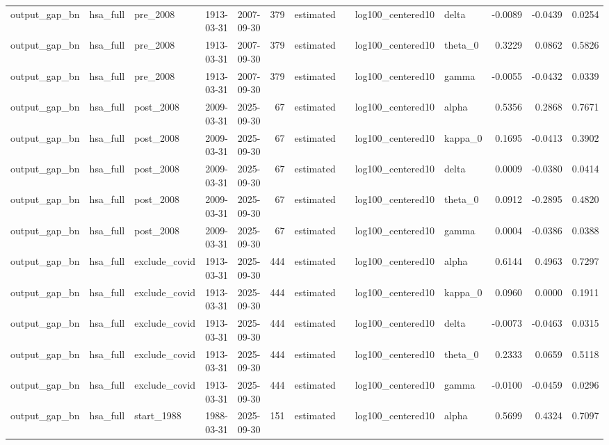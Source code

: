 \begin{tabular}{lllllrllllrrr}
output\_gap\_bn & hsa\_full & pre\_2008 & 1913-03-31 & 2007-09-30 & 379 & estimated &  & log100\_centered10 & delta & -0.0089 & -0.0439 & 0.0254 \\
output\_gap\_bn & hsa\_full & pre\_2008 & 1913-03-31 & 2007-09-30 & 379 & estimated &  & log100\_centered10 & theta\_0 & 0.3229 & 0.0862 & 0.5826 \\
output\_gap\_bn & hsa\_full & pre\_2008 & 1913-03-31 & 2007-09-30 & 379 & estimated &  & log100\_centered10 & gamma & -0.0055 & -0.0432 & 0.0339 \\
output\_gap\_bn & hsa\_full & post\_2008 & 2009-03-31 & 2025-09-30 & 67 & estimated &  & log100\_centered10 & alpha & 0.5356 & 0.2868 & 0.7671 \\
output\_gap\_bn & hsa\_full & post\_2008 & 2009-03-31 & 2025-09-30 & 67 & estimated &  & log100\_centered10 & kappa\_0 & 0.1695 & -0.0413 & 0.3902 \\
output\_gap\_bn & hsa\_full & post\_2008 & 2009-03-31 & 2025-09-30 & 67 & estimated &  & log100\_centered10 & delta & 0.0009 & -0.0380 & 0.0414 \\
output\_gap\_bn & hsa\_full & post\_2008 & 2009-03-31 & 2025-09-30 & 67 & estimated &  & log100\_centered10 & theta\_0 & 0.0912 & -0.2895 & 0.4820 \\
output\_gap\_bn & hsa\_full & post\_2008 & 2009-03-31 & 2025-09-30 & 67 & estimated &  & log100\_centered10 & gamma & 0.0004 & -0.0386 & 0.0388 \\
output\_gap\_bn & hsa\_full & exclude\_covid & 1913-03-31 & 2025-09-30 & 444 & estimated &  & log100\_centered10 & alpha & 0.6144 & 0.4963 & 0.7297 \\
output\_gap\_bn & hsa\_full & exclude\_covid & 1913-03-31 & 2025-09-30 & 444 & estimated &  & log100\_centered10 & kappa\_0 & 0.0960 & 0.0000 & 0.1911 \\
output\_gap\_bn & hsa\_full & exclude\_covid & 1913-03-31 & 2025-09-30 & 444 & estimated &  & log100\_centered10 & delta & -0.0073 & -0.0463 & 0.0315 \\
output\_gap\_bn & hsa\_full & exclude\_covid & 1913-03-31 & 2025-09-30 & 444 & estimated &  & log100\_centered10 & theta\_0 & 0.2333 & 0.0659 & 0.5118 \\
output\_gap\_bn & hsa\_full & exclude\_covid & 1913-03-31 & 2025-09-30 & 444 & estimated &  & log100\_centered10 & gamma & -0.0100 & -0.0459 & 0.0296 \\
output\_gap\_bn & hsa\_full & start\_1988 & 1988-03-31 & 2025-09-30 & 151 & estimated &  & log100\_centered10 & alpha & 0.5699 & 0.4324 & 0.7097 \\

\end{tabular}
